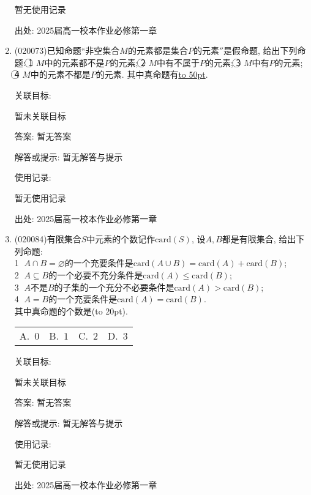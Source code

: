\documentclass[10pt,a4paper]{article}
\newcommand{\blank}[1]{\underline{\hbox to #1pt{}}}
\newcommand{\bracket}[1]{(\hbox to #1pt{})}
\newcommand{\fourch}[4]{\par\begin{tabular}{p{.23\textwidth}p{.23\textwidth}p{.23\textwidth}p{.23\textwidth}}
A.~#1 &B.~#2& C.~#3& D.~#4
\end{tabular}}
\begin{document}
\begin{enumerate}[1.]
暂无使用记录


出处: 2025届高一校本作业必修第一章
\item { (020073)}已知命题``非空集合$M$的元素都是集合$P$的元素$''$是假命题, 给出下列命题: \textcircled{1} $M$中的元素都不是$P$的元素; \textcircled{2} $M$中有不属于$P$的元素; \textcircled{3} $M$中有$P$的元素; \textcircled{4} $M$中的元素不都是$P$的元素. 其中真命题有\blank{50}.


关联目标:

暂未关联目标

答案: 暂无答案

解答或提示: 暂无解答与提示

使用记录:

暂无使用记录


出处: 2025届高一校本作业必修第一章
\item { (020084)}有限集合$S$中元素的个数记作$\mathrm{card}(S)$, 设$A,B$都是有限集合, 给出下列命题:\\
\textcircled{1} $A\cap B=\varnothing$的一个充要条件是$\mathrm{card}(A\cup B)=\mathrm{card}(A)+\mathrm{card}(B)$;\\
\textcircled{2} $A\subseteq B$的一个必要不充分条件是$\mathrm{card}(A)\le \mathrm{card}(B)$; \\
\textcircled{3} $A$不是$B$的子集的一个充分不必要条件是$\mathrm{card}(A)>\mathrm{card}(B)$;\\ 
\textcircled{4} $A=B$的一个充要条件是$\mathrm{card}(A)=\mathrm{card}(B)$.\\ 
其中真命题的个数是\bracket{20}.
\fourch{$0$}{$1$}{$2$}{$3$}


关联目标:

暂未关联目标

答案: 暂无答案

解答或提示: 暂无解答与提示

使用记录:

暂无使用记录


出处: 2025届高一校本作业必修第一章
\end{enumerate}
\end{document}
